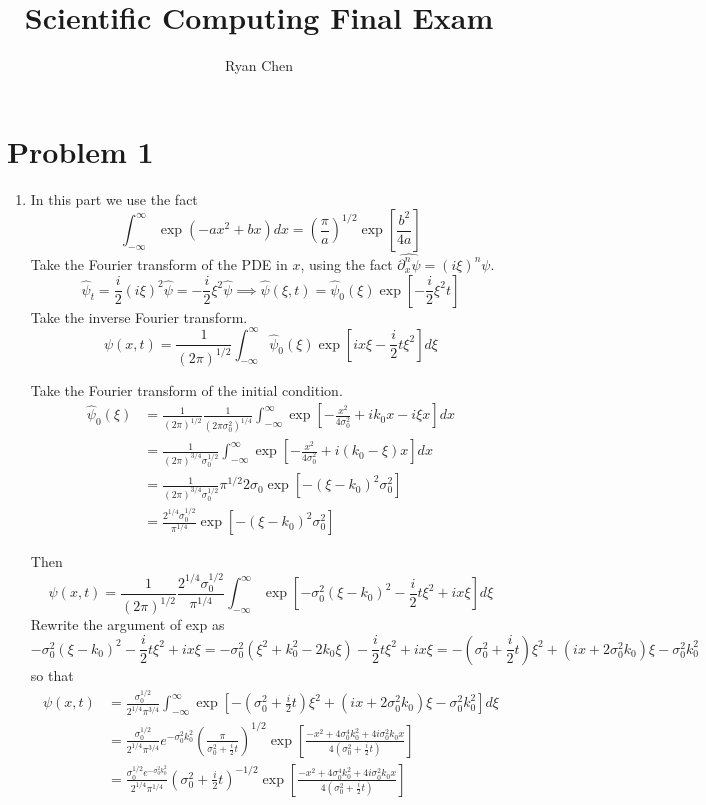 \documentclass{article}
\title{Scientific Computing Final Exam}
\author{Ryan Chen}
\newcommand{\br}[1]{\left(#1\right)}
\newcommand{\imp}{\implies}
\newcommand{\ptl}{\partial}
\begin{document}
	
\maketitle

\section*{Problem 1}

\begin{enumerate}[label=(\alph*)]
	
\item
In this part we use the fact
$$\int_{-\infty}^{\infty}\exp(-ax^2+bx)dx = \br{\frac\pi a}^{1/2}\exp[\frac{b^2}{4a}]$$
Take the Fourier transform of the PDE in $x$, using the fact $\hat{\ptl_x^n\psi}=(i\xi)^n\psi$.
$$\hat\psi_t = \frac i2(i\xi)^2\hat\psi = -\frac i2\xi^2\hat\psi
\imp \hat\psi(\xi,t) = \hat\psi_0(\xi)\exp[-\frac i2\xi^2t]$$
Take the inverse Fourier transform.
$$\psi(x,t) = \frac{1}{(2\pi)^{1/2}}\int_{-\infty}^{\infty} \hat\psi_0(\xi)\exp[ix\xi - \frac i2t\xi^2]d\xi$$

Take the Fourier transform of the initial condition.
\begin{align*}
	\hat\psi_0(\xi) &= \frac{1}{(2\pi)^{1/2}}\frac{1}{(2\pi \sigma_0^2)^{1/4}}\int_{-\infty}^{\infty} \exp[-\frac{x^2}{4\sigma_0^2} + ik_0x - i\xi x]dx\\
	&= \frac{1}{(2\pi)^{3/4}\sigma_0^{1/2}}\int_{-\infty}^{\infty} \exp[-\frac{x^2}{4\sigma_0^2} + i(k_0-\xi)x]dx\\
	&= \frac{1}{(2\pi)^{3/4}\sigma_0^{1/2}}\pi^{1/2}2\sigma_0\exp[-(\xi-k_0)^2\sigma_0^2]\\
	&= \frac{2^{1/4}\sigma_0^{1/2}}{\pi^{1/4}}\exp[-(\xi-k_0)^2\sigma_0^2]
\end{align*}

Then
$$\psi(x,t) = \frac{1}{(2\pi)^{1/2}}\frac{2^{1/4}\sigma_0^{1/2}}{\pi^{1/4}}\int_{-\infty}^{\infty}\exp[-\sigma_0^2(\xi-k_0)^2 - \frac i2t\xi^2 + ix\xi]d\xi$$
Rewrite the argument of exp as
$$-\sigma_0^2(\xi-k_0)^2 - \frac i2t\xi^2 + ix\xi
= -\sigma_0^2(\xi^2+k_0^2-2k_0\xi) - \frac i2t\xi^2 + ix\xi
= -\br{\sigma_0^2 + \frac i2t}\xi^2 + (ix + 2\sigma_0^2k_0)\xi - \sigma_0^2k_0^2$$
so that
\begin{align*}
	\psi(x,t) &= \frac{\sigma_0^{1/2}}{2^{1/4}\pi^{3/4}}\int^{\infty}_{-\infty}\exp[-\br{\sigma_0^2 + \frac i2t}\xi^2 + (ix + 2\sigma_0^2k_0)\xi - \sigma_0^2k_0^2]d\xi\\
	&= \frac{\sigma_0^{1/2}}{2^{1/4}\pi^{3/4}}e^{-\sigma_0^2k_0^2}\br{\frac{\pi}{\sigma_0^2+\frac i2t}}^{1/2}\exp[\frac{-x^2 + 4\sigma_0^4k_0^2 + 4i\sigma_0^2k_0x}{4\br{\sigma_0^2 + \frac i2t}}]\\
	&= \frac{\sigma_0^{1/2}e^{-\sigma_0^2k_0^2}}{2^{1/4}\pi^{1/4}}\br{\sigma_0^2+\frac i2t}^{-1/2}\exp[\frac{-x^2 + 4\sigma_0^4k_0^2 + 4i\sigma_0^2k_0x}{4\br{\sigma_0^2 + \frac i2t}}]
\end{align*}



\end{enumerate}
\end{document}
